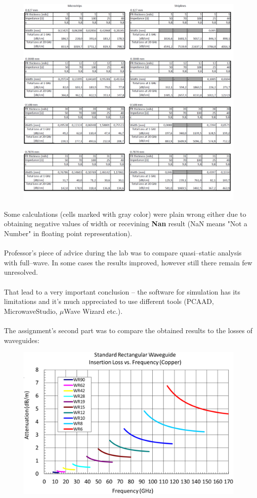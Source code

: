 \documentclass[eng,printmode]{mgr}
\begin{document}
\begin{figure}[h]
	\centering
	\includegraphics[width=1\linewidth]{table2a}
	\label{fig:microm2}
	\caption{}
\end{figure}

Some calculations (cells marked with gray color) were plain wrong either due to obtaining negative values of width or recevining \textbf{Nan} result (NaN means "Not a Number" in floating point representation).\\
\\
Professor's piece of advice during the lab was to compare quasi--static analysis with full--wave. In some cases the results improved, however still there remain few unresolved.\\
\\
That lead to a very important conclusion -- the software for simulation has its limitations and it's much appreciated to use different tools (PCAAD, MicrowaveStudio, $\mu$Wave Wizard etc.).\\
\\
\newpage
The assignment's second part was to compare the obtained results to the losses of waveguides:
\begin{figure}[h]
	\centering
	\includegraphics[width=0.6\linewidth]{waveguides}
	\label{fig:waveguides}
\end{figure}
\end{document}
